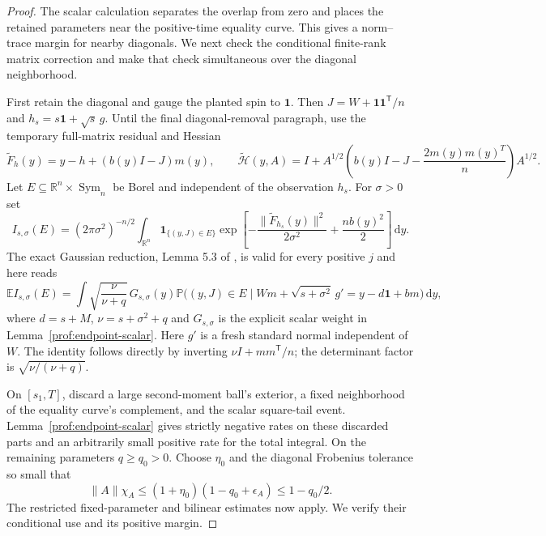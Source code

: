 \begin{proof}
The scalar calculation separates the overlap from zero and places the
retained parameters near the positive-time equality curve. This gives
a norm--trace margin for nearby diagonals. We next check the conditional
finite-rank matrix correction and make that check simultaneous over
the diagonal neighborhood.

First retain the diagonal and gauge the planted spin to $\mathbf1$.
Then $J=W+\mathbf1\mathbf1^{\mathsf T}/n$ and
$h_s=s\mathbf1+\sqrt s\,g$. Until the final diagonal-removal
paragraph, use the temporary full-matrix residual and Hessian
\[
 \widetilde F_h(y)=y-h+(b(y)I-J)m(y),\qquad
 \widetilde{\mathcal H}(y,A)=I+A^{1/2}
 \left(b(y)I-J-\frac{2m(y)m(y)^T}{n}\right)A^{1/2}.
\]
Let \(E\subseteq\mathbb R^n\times\operatorname{Sym}_n\) be Borel
and independent of the observation \(h_s\). For \(\sigma>0\) set
\[
 I_{s,\sigma}(E)=(2\pi\sigma^2)^{-n/2}\int_{\mathbb R^n}
 \mathbf1_{\{(y,J)\in E\}}
 \exp\left[-\frac{\|\widetilde F_{h_s}(y)\|^2}{2\sigma^2}
                  +\frac{nb(y)^2}{2}\right]\,\mathrm dy.
\]
The exact Gaussian reduction, Lemma 5.3 of
\cite{AcceptedGap}, is valid for every positive $j$ and
here reads
\[
 \mathbb E I_{s,\sigma}(E)
 =\int\sqrt{\frac\nu{\nu+q}}\,G_{s,\sigma}(y)
 \mathbb P\bigl((y,J)\in E\mid
 Wm+\sqrt{s+\sigma^2}\,g'=y-d\mathbf1+bm\bigr)\,\mathrm dy,
\]
where $d=s+M$, $\nu=s+\sigma^2+q$ and $G_{s,\sigma}$ is the
explicit scalar weight in Lemma~\ref{prof:endpoint-scalar}.
Here \(g'\) is a fresh standard normal independent of \(W\).
The identity follows directly by inverting
$\nu I+mm^{\mathsf T}/n$; the determinant factor is
$\sqrt{\nu/(\nu+q)}$.

On $[s_1,T]$, discard a large second-moment ball's exterior, a fixed
neighborhood of the equality curve's complement, and the scalar
square-tail event.  Lemma~\ref{prof:endpoint-scalar} gives strictly
negative rates on these discarded parts and an arbitrarily small
positive rate for the total integral.  On the remaining parameters
$q\ge q_0>0$.  Choose $\eta_0$ and the diagonal Frobenius tolerance so
small that
\[
 \|A\|\chi_A\le(1+\eta_0)(1-q_0+\epsilon_A)
 \le1-q_0/2.
\]
The restricted fixed-parameter and bilinear estimates now apply.
We verify their conditional use and its positive margin.


\end{proof}
